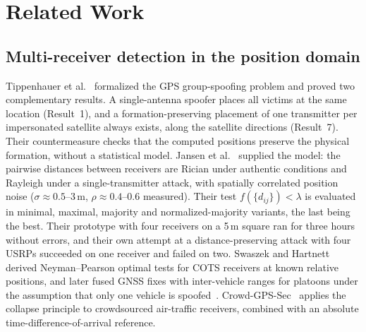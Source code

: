 \documentclass[conference]{IEEEtran}
\begin{document}
\section{Related Work}
\label{sec:related}

\subsection{Multi-receiver detection in the position domain}
Tippenhauer et al.~\cite{tippenhauer2011requirements} formalized the GPS
group-spoofing problem and proved two complementary results. A
single-antenna spoofer places all victims at the same location
(Result~1), and a formation-preserving placement of one transmitter per
impersonated satellite always exists, along the satellite directions
(Result~7). Their countermeasure checks that the computed positions
preserve the physical formation, without a statistical model. Jansen et
al.~\cite{jansen2016multireceiver} supplied the model: the pairwise
distances between receivers are Rician under authentic conditions and
Rayleigh under a single-transmitter attack, with spatially correlated
position noise ($\sigma\approx0.5$--$3$\,m, $\rho\approx0.4$--$0.6$
measured). Their test $f(\{d_{ij}\})<\lambda$ is evaluated in minimal,
maximal, majority and normalized-majority variants, the last being the
best. Their prototype with four receivers on a 5\,m square ran for three
hours without errors, and their own attempt at a distance-preserving
attack with four USRPs succeeded on one receiver and failed on two.
Swaszek and Hartnett~\cite{swaszek2013multicots} derived Neyman--Pearson
optimal tests for COTS receivers at known relative positions, and later
fused GNSS fixes with inter-vehicle ranges for platoons under the
assumption that only one vehicle is spoofed~\cite{swaszek2017platoon}.
Crowd-GPS-Sec~\cite{jansen2018crowdgpssec} applies the collapse
principle to crowdsourced air-traffic receivers, combined with an
absolute time-difference-of-arrival reference.
\end{document}
